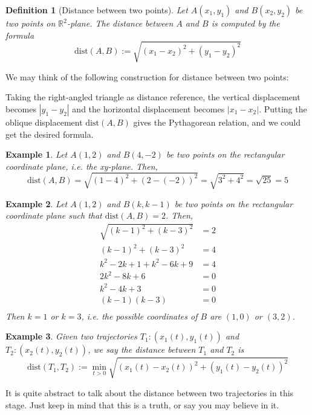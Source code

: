 \documentclass[12pt]{article}
\newtheorem{definition}{Definition}[section]
\newtheorem*{example}{Example}
\begin{document}
    \begin{definition}[Distance between two points]
        Let $A(x_1,y_1)$ and $B(x_2,y_2)$ be two points on $\mathbb{R}^2$-plane. The distance between $A$ and $B$ is computed by the formula $$\mathrm{dist}(A,B):=\sqrt{(x_1-x_2)^2+(y_1-y_2)^2}$$
    \end{definition}

    We may think of the following construction for distance between two points:

    Taking the right-angled triangle as distance reference, the vertical displacement becomes $|y_1-y_2|$ and the horizontal displacement becomes $|x_1-x_2|$. Putting the oblique displacement $\mathrm{dist}(A,B)$ gives the Pythagorean relation, and we could get the desired formula.

    \begin{example}
        Let $A(1,2)$ and $B(4,-2)$ be two points on the rectangular coordinate plane, i.e. the xy-plane. Then, $$\mathrm{dist}(A,B)=\sqrt{(1-4)^2+(2-(-2))^2}=\sqrt{3^2+4^2}=\sqrt{25}=5$$
    \end{example}

    \begin{example}
        Let $A(1,2)$ and $B(k,k-1)$ be two points on the rectangular coordinate plane such that $\mathrm{dist}(A,B)=2$. Then, \begin{align*}
            \sqrt{(k-1)^2+(k-3)^2}&=2\\
            (k-1)^2+(k-3)^2&=4\\
            k^2-2k+1+k^2-6k+9&=4\\
            2k^2-8k+6&=0\\
            k^2-4k+3&=0\\
            (k-1)(k-3)&=0\\
        \end{align*}
        Then $k=1$ or $k=3$, i.e. the possible coordinates of $B$ are $(1,0)$ or $(3,2)$.
    \end{example}

    \begin{example}
        Given two trajectories $T_1:(x_1(t),y_1(t))$ and $T_2:(x_2(t),y_2(t))$, we say the distance between $T_1$ and $T_2$ is $$\mathrm{dist}(T_1,T_2):=\min_{t>0}\sqrt{(x_1(t)-x_2(t))^2+(y_1(t)-y_2(t))^2}$$
    \end{example}

    It is quite abstract to talk about the distance between two trajectories in this stage. Just keep in mind that this is a truth, or say you may believe in it.
\end{document}
